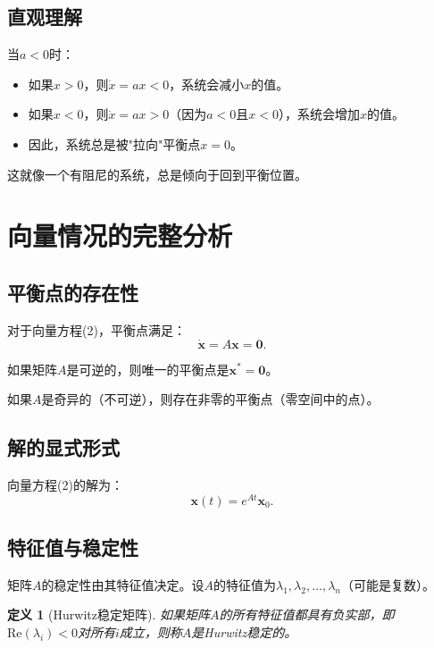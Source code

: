 \documentclass[12pt,a4paper]{article}
\newtheorem{definition}{定义}
\begin{document}
\subsection{直观理解}

当$a < 0$时：
\begin{itemize}
\item 如果$x > 0$，则$\dot{x} = ax < 0$，系统会减小$x$的值。
\item 如果$x < 0$，则$\dot{x} = ax > 0$（因为$a < 0$且$x < 0$），系统会增加$x$的值。
\item 因此，系统总是被"拉向"平衡点$x = 0$。
\end{itemize}

这就像一个有阻尼的系统，总是倾向于回到平衡位置。

\section{向量情况的完整分析}

\subsection{平衡点的存在性}

对于向量方程(2)，平衡点满足：
\begin{equation}
\dot{\mathbf{x}} = A\mathbf{x} = \mathbf{0}.
\end{equation}

如果矩阵$A$是可逆的，则唯一的平衡点是$\mathbf{x}^* = \mathbf{0}$。

如果$A$是奇异的（不可逆），则存在非零的平衡点（零空间中的点）。

\subsection{解的显式形式}

向量方程(2)的解为：
\begin{equation}
\mathbf{x}(t) = e^{At}\mathbf{x}_0.
\end{equation}

\subsection{特征值与稳定性}

矩阵$A$的稳定性由其特征值决定。设$A$的特征值为$\lambda_1, \lambda_2, \ldots, \lambda_n$（可能是复数）。

\begin{definition}[Hurwitz稳定矩阵]
如果矩阵$A$的所有特征值都具有负实部，即$\text{Re}(\lambda_i) < 0$对所有$i$成立，则称$A$是Hurwitz稳定的。
\end{definition}
\end{document}
